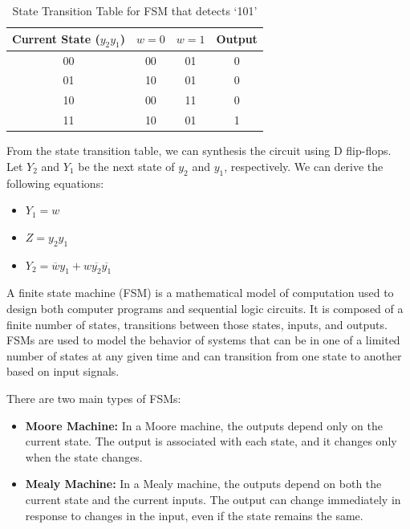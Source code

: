 \documentclass[11pt]{report}
\begin{document}
\begin{example}
    \begin{table}[h!]
        \centering
        \begin{tabular}{|c|cc|c|}
            \hline
            Current State ($y_2 y_1$) & $w=0$ & $w=1$ & Output \\
            \hline
            00 & 00 & 01 & 0 \\
            01 & 10 & 01 & 0 \\
            10 & 00 & 11 & 0 \\
            11 & 10 & 01 & 1 \\
            \hline
        \end{tabular}
        \caption{State Transition Table for FSM that detects `101'}
        \label{tab:fsm_state_transition_table}
    \end{table}

    From the state transition table, we can synthesis the circuit using D flip-flops. Let $Y_2$ and $Y_1$ be the next state of $y_2$ and $y_1$, respectively. We can derive the following equations:
    \begin{itemize}
        \item $Y_1 = w$
        \item $Z = y_2 y_1$
        \item $Y_2 = \overline{w} y_1 + w \overline{y_2} \overline{y_1}$
    \end{itemize}
    
\end{example}

\begin{definition}
    A finite state machine (FSM) is a mathematical model of computation used to design both computer programs and sequential logic circuits. It is composed of a finite number of states, transitions between those states, inputs, and outputs. FSMs are used to model the behavior of systems that can be in one of a limited number of states at any given time and can transition from one state to another based on input signals.

    There are two main types of FSMs:
    \begin{itemize}
        \item \textbf{Moore Machine:} In a Moore machine, the outputs depend only on the current state. The output is associated with each state, and it changes only when the state changes.
        \item \textbf{Mealy Machine:} In a Mealy machine, the outputs depend on both the current state and the current inputs. The output can change immediately in response to changes in the input, even if the state remains the same.
    \end{itemize}
\end{definition}
\end{document}
